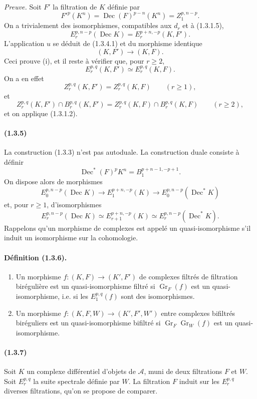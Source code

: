 \documentclass[10pt]{article}
\newcommand{\Gr}{\operatorname{Gr}}
\newcommand{\calA}{\mathcal A}
\newcommand{\Dec}{\operatorname{Dec}}
\begin{document}
\emph{Preuve.} Soit $F'$ la filtration de $K$ définie par
\[
F'^p(K^n)=\Dec(F)^{p-n}(K^n)=Z_1^{p,n-p}.
\]
On a trivialement des isomorphismes, compatibles aux $d_r$ et à (1.3.1.5),
\[
\tag{1.3.4.1}
E_r^{p,n-p}(\Dec K)=E_r^{p+n,-p}(K,F').
\]
L'application $u$ se déduit de (1.3.4.1) et du morphisme identique
\[
(K,F')\longrightarrow(K,F).
\]
Ceci prouve (i), et il reste à vérifier que, pour $r\ge2$,
\[
E_r^{p,q}(K,F')\simeq E_r^{p,q}(K,F).
\]
On a en effet
\[
Z_r^{p,q}(K,F')=Z_r^{p,q}(K,F)\qquad(r\ge1),
\]
et
\[
Z_r^{p,q}(K,F')\cap B_r^{p,q}(K,F')=Z_r^{p,q}(K,F)\cap B_r^{p,q}(K,F)\qquad(r\ge2),
\]
et on applique (1.3.1.2).

\paragraph{(1.3.5)} La construction (1.3.3) n'est pas autoduale. La construction duale consiste à définir
\[
\Dec^*(F)^pK^n=B_1^{p+n-1,-p+1}.
\]
On dispose alors de morphismes
\[
E_0^{p,n-p}(\Dec K)\longrightarrow E_1^{p+n,-p}(K)\longrightarrow E_0^{p,n-p}(\Dec^*K)
\]
et, pour $r\ge1$, d'isomorphismes
\[
E_r^{p,n-p}(\Dec K)\simeq E_{r+1}^{p+n,-p}(K)\simeq E_r^{p,n-p}(\Dec^*K).
\]
Rappelons qu'un morphisme de complexes est appelé un quasi-isomorphisme s'il induit un isomorphisme sur la cohomologie.

\paragraph{Définition (1.3.6).}
\begin{enumerate}[label=(\roman*)]
\item Un morphisme $f:(K,F)\to(K',F')$ de complexes filtrés de filtration birégulière est un quasi-isomorphisme filtré si $\Gr_F(f)$ est un quasi-isomorphisme, i.e. si les $E_1^{p,q}(f)$ sont des isomorphismes.
\item Un morphisme $f:(K,F,W)\to(K',F',W')$ entre complexes bifiltrés biréguliers est un quasi-isomorphisme bifiltré si $\Gr_F\Gr_W(f)$ est un quasi-isomorphisme.
\end{enumerate}

\paragraph{(1.3.7)} Soit $K$ un complexe différentiel d'objets de $\calA$, muni de deux filtrations $F$ et $W$. Soit $E_r^{p,q}$ la suite spectrale définie par $W$. La filtration $F$ induit sur les $E_r^{p,q}$ diverses filtrations, qu'on se propose de comparer.
\end{document}
